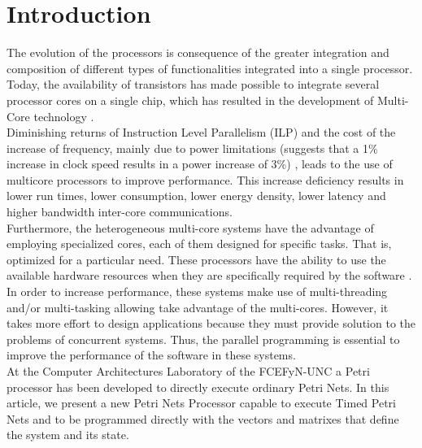 \section{Introduction}
	
	The evolution of the processors is consequence of the greater integration and composition of different 
	types of functionalities integrated into a single processor. Today, the availability of transistors 
	has made possible to integrate several processor cores on a single chip, which has resulted in 
	the development of Multi-Core technology \cite{hennessypatterson}.
	\\
	
	Diminishing returns of Instruction Level Parallelism (ILP) and the cost of the increase of frequency, 
	mainly due to power limitations (suggests that a 1\% increase in clock speed results in a power 
	increase of 3\%) \cite{gspn}, leads to the use of multicore processors to improve performance. 
	This increase deficiency results in lower run times, lower consumption, lower energy density, 
	lower latency and higher bandwidth inter-core communications.
	\\
	
	Furthermore, the heterogeneous multi-core systems have the advantage of employing specialized cores, 
	each of them designed for specific tasks. That is, optimized for a particular need. These processors 
	have the ability to use the available hardware resources when they are specifically required by 
	the software  \cite{SriramBhattacharyya}.
	\\
	
	In order to increase performance, these systems make use of multi-threading and/or multi-tasking 
	allowing take advantage of the multi-cores. However, it takes more effort to design applications 
	because they must provide solution to the problems of concurrent systems. Thus, the parallel 
	programming is essential to improve the performance of the software in these systems.
    \\
	
	At the Computer Architectures Laboratory of the FCEFyN-UNC a Petri processor has been developed 
	to directly execute ordinary Petri Nets. In this article, we present a new Petri Nets Processor 
	capable to execute Timed Petri Nets and to be programmed directly with the vectors and matrixes 
	that define the system and its state.
	